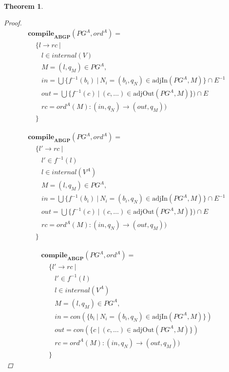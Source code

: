 \documentclass[twocolumn]{sig-alternate-10pt}
\newtheorem{thm}{Theorem}[section]
\begin{document}
\begin{thm}
\begin{proof}
    \[ \begin{array}{l}
       \textbf{compile}_\textbf{ABGP}(PG^A,ord^A) = \\
       ~~~~~ \{ l \rightarrow rc ~\vert \\
       ~~~~~~~~~ l \in internal(V) \\
       ~~~~~~~~~ M = (l,q_M) \in PG^A, \\
       ~~~~~~~~~ in = \bigcup \{ f^{-1}(b_i) ~\vert~ N_i = (b_i,q_N) \in \text{adjIn}(PG^A,M) \} \cap E^{-1} \\
       ~~~~~~~~~ out = \bigcup \{ f^{-1}(c) ~\vert~ (c,\dots) \in \text{adjOut}(PG^A,M) \}) \cap E \\
       ~~~~~~~~~ rc = ord^A(M) : (in,q_N) \rightarrow (out,q_M)) \\
       ~~~~~ \}
    \end{array} \]%

    \[ \begin{array}{l}
       \textbf{compile}_\textbf{ABGP}(PG^A,ord^A) = \\
       ~~~~~ \{ l' \rightarrow rc ~\vert \\
       ~~~~~~~~~ l' \in f^{-1}(l) \\
       ~~~~~~~~~ l \in internal(V^A) \\
       ~~~~~~~~~ M = (l,q_M) \in PG^A, \\
       ~~~~~~~~~ in = \bigcup \{ f^{-1}(b_i) ~\vert~ N_i = (b_i,q_N) \in \text{adjIn}(PG^A,M) \} \cap E^{-1} \\
       ~~~~~~~~~ out = \bigcup \{ f^{-1}(c) ~\vert~ (c,\dots) \in \text{adjOut}(PG^A,M) \}) \cap E \\ 
       ~~~~~~~~~ rc = ord^A(M) : (in,q_N) \rightarrow (out,q_M)) \\
       ~~~~~ \}
    \end{array} \]%

    \[ \begin{array}{l}
       \textbf{compile}_\textbf{ABGP}(PG^A,ord^A) = \\
       ~~~~~ \{ l' \rightarrow rc ~\vert \\
       ~~~~~~~~~ l' \in f^{-1}(l) \\
       ~~~~~~~~~ l \in internal(V^A) \\
       ~~~~~~~~~ M = (l,q_M) \in PG^A, \\
       ~~~~~~~~~ in = con(\{ b_i ~\vert~ N_i = (b_i,q_N) \in \text{adjIn}(PG^A,M) \}) \\
       ~~~~~~~~~ out = con(\{ c ~\vert~ (c,\dots) \in \text{adjOut}(PG^A,M) \}) \\
       ~~~~~~~~~ rc = ord^A(M) : (in,q_N) \rightarrow (out,q_M)) \\
       ~~~~~ \}
    \end{array} \]%


\end{proof}
\end{thm}
\end{document}
